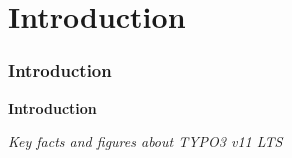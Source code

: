 %

\section{Introduction}
\begin{frame}[fragile]
	\frametitle{Introduction}

	\begin{center}\huge{\color{typo3darkgrey}\textbf{Introduction}}\end{center}
	\begin{center}\large{\textit{Key facts and figures about TYPO3 v11 LTS}}\end{center}

\end{frame}

